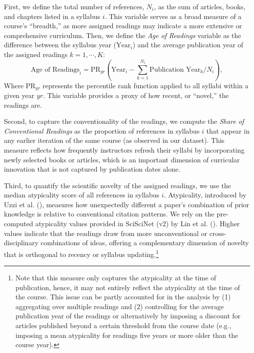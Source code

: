 \documentclass[
  11pt,
]{article}
\begin{document}
First, we define the total number of references, \(N_i\), as the sum of articles, books, and chapters listed in a syllabus \(i\). This variable serves as a broad measure of a course's ``breadth,'' as more assigned readings may indicate a more extensive or comprehensive curriculum. Then, we define the \emph{Age of Readings} variable as the difference between the syllabus year (\(\text{Year}_i\)) and the average publication year of the assigned readings \(k=1,\cdots,K\):\\
\[
  \text{Age of Readings}_i = \text{PR}_{yr}\left(\text{Year}_i - \sum_{k=1}^{N_i} \text{Publication Year}_k / N_i\right),
\]
Where \(\text{PR}_{yr}\) represents the percentile rank function applied to all syllabi within a given year \(yr\). This variable provides a proxy of how recent, or ``novel,'' the readings are.

Second, to capture the conventionality of the readings, we compute the \emph{Share of Conventional Readings} as the proportion of references in syllabus \(i\) that appear in any earlier iteration of the same course (as observed in our dataset). This measure reflects how frequently instructors refresh their syllabi by incorporating newly selected books or articles, which is an important dimension of curricular innovation that is not captured by publication dates alone.

Third, to quantify the scientific novelty of the assigned readings, we use the median atypicality score of all references in syllabus \(i\). Atypicality, introduced by Uzzi et al. (), measures how unexpectedly different a paper's combination of prior knowledge is relative to conventional citation patterns. We rely on the pre-computed atypicality values provided in SciSciNet (v2) by Lin et al. (). Higher values indicate that the readings draw from more unconventional or cross-disciplinary combinations of ideas, offering a complementary dimension of novelty that is orthogonal to recency or syllabus updating.\footnote{
  Note that this measure only captures the atypicality at the time of publication, hence, it may not entirely reflect the atypicality at the time of the course. This issue can be partly accounted for in the analysis by (1) aggregating over multiple readings and (2) controlling for the average publication year of the readings or alternatively by imposing a discount for articles published beyond a certain threshold from the course date (e.g., imposing a mean atypicality for readings five years or more older than the course year).}
\end{document}
